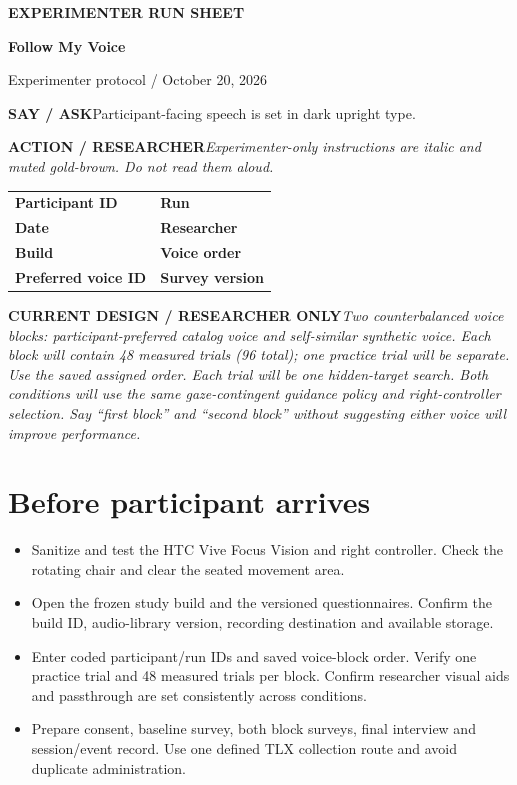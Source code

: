 \documentclass[11pt,letterpaper]{article}
\newcommand{\step}[1]{\Needspace{7\baselineskip}\section{#1}}
\newcommand{\say}[2]{\Needspace{4\baselineskip}\par\textbf{#1}\enspace #2\par}
\newcommand{\action}[2]{\Needspace{3\baselineskip}\par{\color{ActionInk}\textbf{#1}\enspace\textit{#2}}\par}
\newcommand{\field}[1]{\textbf{#1}\enspace\hrulefill}
\begin{document}
\begin{tcolorbox}[colback=Ink,colframe=Ink,arc=0mm,left=20pt,right=20pt,top=25pt,bottom=25pt]
{\color{Gold}\bfseries EXPERIMENTER RUN SHEET\par}
\vspace{12pt}
{\color{white}\fontsize{32}{37}\selectfont\bfseries Follow My Voice\par}
\vspace{12pt}
{\color{white}\small Experimenter protocol / October 20, 2026\par}
\end{tcolorbox}
\say{SAY / ASK}{Participant-facing speech is set in dark upright type.}
\action{ACTION / RESEARCHER}{Experimenter-only instructions are italic and muted gold-brown. Do not read them aloud.}
\begin{tabularx}{\linewidth}{@{}XX@{}}
\field{Participant ID} & \field{Run} \\[14pt]
\field{Date} & \field{Researcher} \\[14pt]
\field{Build} & \field{Voice order} \\[14pt]
\field{Preferred voice ID} & \field{Survey version} \\
\end{tabularx}
\vspace{8pt}
\action{CURRENT DESIGN / RESEARCHER ONLY}{Two counterbalanced voice blocks: participant-preferred catalog voice and self-similar synthetic voice. Each block will contain 48 measured trials (96 total); one practice trial will be separate. Use the saved assigned order. Each trial will be one hidden-target search. Both conditions will use the same gaze-contingent guidance policy and right-controller selection. Say ``first block'' and ``second block'' without suggesting either voice will improve performance.}
\step{Before participant arrives}
{\color{ActionInk}\itshape
\begin{itemize}
\item {Sanitize and test the HTC Vive Focus Vision and right controller. Check the rotating chair and clear the seated movement area.}
\item {Open the frozen study build and the versioned questionnaires. Confirm the build ID, audio-library version, recording destination and available storage.}
\item {Enter coded participant/run IDs and saved voice-block order. Verify one practice trial and 48 measured trials per block. Confirm researcher visual aids and passthrough are set consistently across conditions.}
\item {Prepare consent, baseline survey, both block surveys, final interview and session/event record. Use one defined TLX collection route and avoid duplicate administration.}
\end{itemize}
}
\end{document}
